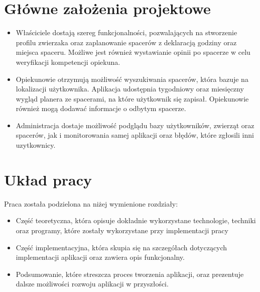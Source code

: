 \section{Główne założenia projektowe}
\begin{itemize}
    \item Właściciele dostają szereg funkcjonalności, pozwalających na stworzenie profilu zwierzaka oraz zaplanowanie spacerów z deklaracją godziny oraz miejsca spaceru. Możliwe jest również wystawianie opinii po spacerze w celu weryfikacji kompetencji opiekuna.
    \item Opiekunowie otrzymują możliwość wyszukiwania spacerów, która bazuje na lokalizacji użytkownika. Aplikacja udostępnia tygodniowy oraz miesięczny wygląd planera ze spacerami, na które użytkownik się zapisał. Opiekunowie również mogą dodawać informacje o odbytym spacerze.
    \item Administracja dostaje możliwość podglądu bazy użytkowników, zwierząt oraz spacerów, jak i monitorowania samej aplikacji oraz błędów, które zgłosili inni uzytkownicy.
\end{itemize}
\section{Układ pracy}
Praca została podzielona na niżej wymienione rozdziały:
\begin{itemize}
    \item Część teoretyczna, która opisuje dokładnie wykorzystane technologie, techniki oraz programy, które zostały wykorzystane przy implementacji pracy

    \item Część implementacyjna, która skupia się na szczegółach dotyczących implementacji aplikacji oraz zawiera opis funkcjonalny.

    \item Podsumowanie, które streszcza proces tworzenia aplikacji, oraz prezentuje dalsze możliwości rozwoju aplikacji w przyszłości.
\end{itemize}

